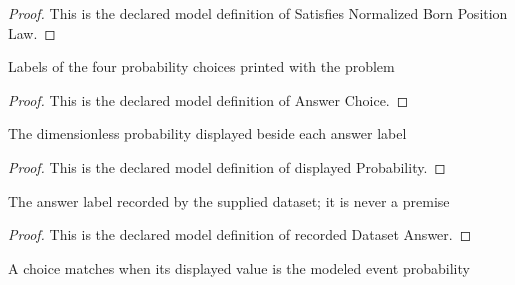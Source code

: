\begin{proof}
  This is the declared model definition of Satisfies Normalized Born Position Law.
\end{proof}
\begin{definition}
  \label{def:physics:phyx-mini-0652:phyxminiproblems-problemphyxmini0652-answerchoice}
  Labels of the four probability choices printed with the problem
\end{definition}
\begin{proof}
  This is the declared model definition of Answer Choice.
\end{proof}
\begin{definition}
  \label{def:physics:phyx-mini-0652:phyxminiproblems-problemphyxmini0652-displayedprobability}
  The dimensionless probability displayed beside each answer label
\end{definition}
\begin{proof}
  This is the declared model definition of displayed Probability.
\end{proof}
\begin{definition}
  \label{def:physics:phyx-mini-0652:phyxminiproblems-problemphyxmini0652-recordeddatasetanswer}
  The answer label recorded by the supplied dataset; it is never a premise
\end{definition}
\begin{proof}
  This is the declared model definition of recorded Dataset Answer.
\end{proof}
\begin{definition}
  \label{def:physics:phyx-mini-0652:phyxminiproblems-problemphyxmini0652-matchesdisplayedprobability}
  A choice matches when its displayed value is the modeled event probability
\end{definition}
